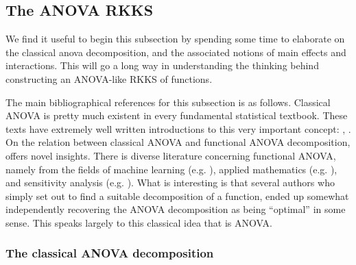 \documentclass[a4paper,showframe,11pt,draft]{report}
\begin{document}
\subsection{The ANOVA RKKS}

We find it useful to begin this subsection by spending some time to elaborate on the classical \gls{anova} decomposition, and the associated notions of main effects and interactions.
This will go a long way in understanding the thinking behind constructing an ANOVA-like RKKS of functions.

The main bibliographical references for this subsection is as follows.
Classical ANOVA is pretty much existent in every fundamental statistical textbook. 
These texts have extremely well written introductions to this very important concept: \citet[Ch. 11]{casella2002statistical}, \citet[Ch. 3]{dean1999design}.
On the relation between classical ANOVA and functional ANOVA decomposition, \citet{gu2013smoothing} offers novel insights.
There is diverse literature concerning functional ANOVA, namely from the fields of machine learning (e.g. \cite{durrande2013anova}), applied mathematics (e.g. \cite{kuo2010decompositions}), and sensitivity analysis (e.g. \cite{sobol2001global}).
What is interesting is that several authors who simply set out to find a suitable decomposition of a function, ended up somewhat independently recovering the ANOVA decomposition as being ``optimal'' in some sense.
This speaks largely to this classical idea that is ANOVA.

\subsubsection{The classical ANOVA decomposition}
\end{document}
